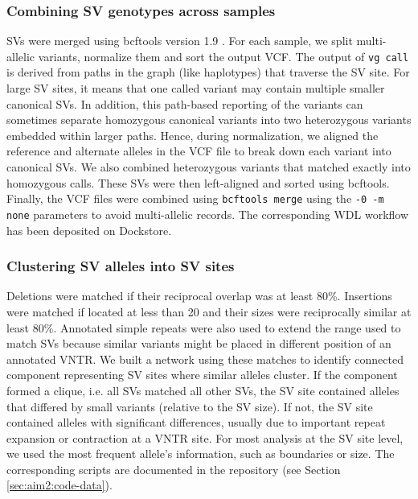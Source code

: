 \documentclass[11pt]{ucscthesis}
\begin{document}
\subsubsection{Combining SV genotypes across samples}
\label{subsec:aim2:svcombining}

SVs were merged using bcftools version 1.9 \cite{li_samtools_2011}.
For each sample, we split multi-allelic variants, normalize them and sort the output VCF.
The output of \texttt{vg~call} is derived from paths in the graph (like haplotypes) that traverse the SV site.
For large SV sites, it means that one called variant may contain multiple smaller canonical SVs.
In addition, this path-based reporting of the variants can sometimes separate homozygous canonical variants into two heterozygous variants embedded within larger paths.
Hence, during normalization, we aligned the reference and alternate alleles in the VCF file to break down each variant into canonical SVs.
We also combined heterozygous variants that matched exactly into homozygous calls.
These SVs were then left-aligned and sorted using bcftools.
Finally, the VCF files were combined using \texttt{bcftools merge} using the \verb~-0 -m none~ parameters to avoid multi-allelic records.
The corresponding WDL workflow has been deposited on Dockstore\cite{svmerge_dockstore}.

\subsubsection{Clustering SV alleles into SV sites}
\label{subsec:aim2:svclustering}

Deletions were matched if their reciprocal overlap was at least 80\%.
Insertions were matched if located at less than 20 and their sizes were reciprocally similar at least 80\%.
Annotated simple repeats were also used to extend the range used to match SVs because similar variants might be placed in different position of an annotated VNTR.
We built a network using these matches to identify connected component representing SV sites where similar alleles cluster.
If the component formed a clique, i.e. all SVs matched all other SVs, the SV site contained alleles that differed by small variants (relative to the SV size).
If not, the SV site contained alleles with significant differences, usually due to important repeat expansion or contraction at a VNTR site.
For most analysis at the SV site level, we used the most frequent allele's information, such as boundaries or size.
The corresponding scripts are documented in the repository (see Section \ref{sec:aim2:code-data}).
\end{document}
